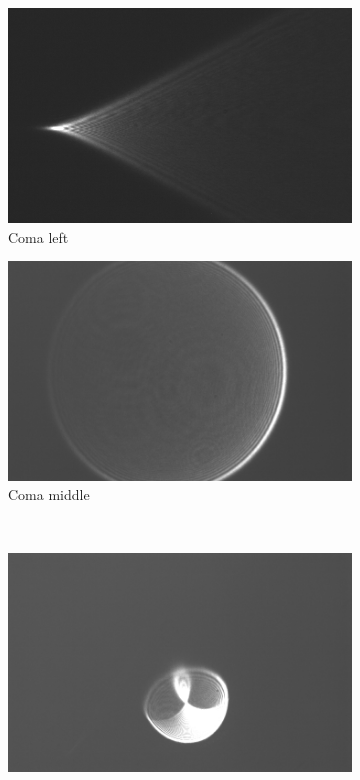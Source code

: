 \documentclass[a4paper,12pt]{article}
\begin{document}
\begin{figure}[H]
        \centering
        \begin{subfigure}{0.3\textwidth}
                \includegraphics[width=\textwidth]{comavenstre2}
                \caption{Coma left}
                \label{fig:comavenstre}
        \end{subfigure}
        \begin{subfigure}{0.3\textwidth}
                \includegraphics[width=\textwidth]{comamidt}
                \caption{Coma middle}
                \label{fig:comamidt}
        \end{subfigure}%
        ~ %
        \begin{subfigure}{0.3\textwidth}
                \includegraphics[width=\textwidth]{comaned}

\end{subfigure}
\end{figure}
\end{document}
